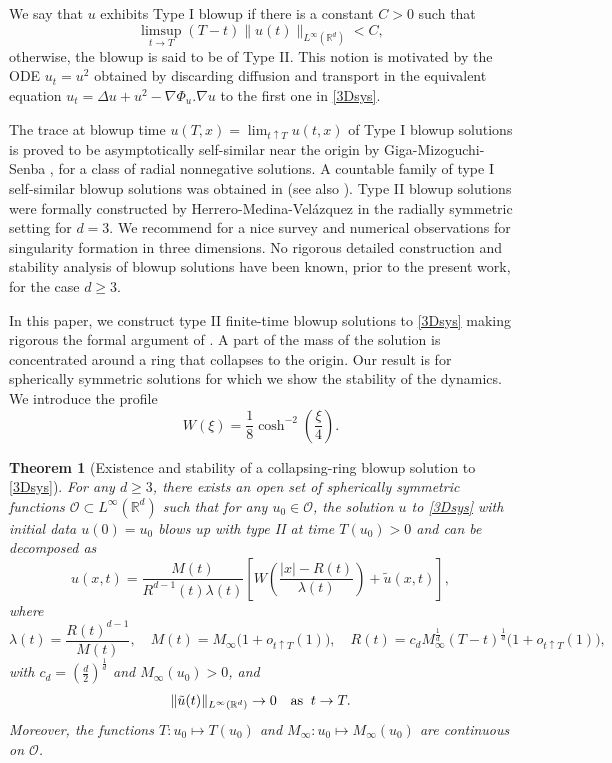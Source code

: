 \documentclass[11pt]{aims}
\newtheorem{theorem}{Theorem}[section]
\theoremstyle{definition}
\newcommand{\Rb}{\mathbb{R}}
\newcommand{\Oc}{\mathcal{O}}
\numberwithin{equation}{section}
\begin{document}
We say that $u$ exhibits Type I blowup if there is a constant $C > 0$ such that 
$$\limsup_{t \to T} (T-t)\| u(t)\|_{L^\infty(\Rb^d)} < C,$$
otherwise, the blowup is said to be of Type II. This notion is motivated by the ODE $u_t = u^2$ obtained by discarding
diffusion and transport in the equivalent equation $u_t = \Delta u + u^2 - \nabla \Phi_u. \nabla u$ to the first one in \eqref{3Dsys}.

The trace at blowup time $u(T,x)=\lim_{t\uparrow T}u(t,x)$ of Type I blowup solutions is proved to be asymptotically self-similar near the origin by Giga-Mizoguchi-Senba \cite{GMSarma11}, for a class of radial nonnegative solutions. A countable family of type I self-similar blowup solutions was obtained in \cite{HMVjcam98} (see also \cite{Se}). Type II blowup solutions were formally constructed by Herrero-Medina-Vel\'azquez \cite{HMVnonl97} in the radially symmetric setting for $d = 3$. We recommend \cite{BCKSVnon99} for a nice survey and numerical observations for singularity formation in three dimensions. No rigorous detailed construction and stability analysis of blowup solutions have been known, prior to the present work, for the case $d \geq 3$.

In this paper, we construct type II finite-time blowup solutions to \eqref{3Dsys} making rigorous the formal argument of \cite{HMVnonl97}. A part of the mass of the solution is concentrated around a ring that collapses to the origin. Our result is for spherically symmetric solutions for which we show the stability of the dynamics. We introduce the profile
$$
W(\xi)=\frac 18 \cosh^{-2}\left(\frac \xi 4 \right).
$$


\begin{theorem}[Existence and stability of a collapsing-ring blowup solution to \eqref{3Dsys}]  \label{theo:1}  For any $d \geq 3$, there exists an open set of spherically symmetric functions $\Oc \subset L^{\infty}(\mathbb R^d)$ such that for any $ u_0 \in \Oc$, the solution $u$ to \eqref{3Dsys} with initial data $u(0)=u_0$ blows up with type II at time $T(u_0)>0$ and can be decomposed as 
\begin{equation}\label{eq:decomp_murt}
u(x,t) = \frac{M(t)}{R^{d-1}(t)\lambda(t)} \left[W\left(\frac{|x|-R(t)}{\lambda(t)}  \right)+\tilde u\left(x,t\right)\right],
\end{equation}
 where
\begin{equation}\label{eq:bdparametersmainth}
\lambda(t) = \frac{R(t)^{d-1}}{M(t)}, \quad M(t) =  M_\infty \big(1 + o_{t \uparrow T}(1)\big), \quad R(t) = c_d M_\infty^{\frac 1d} (T-t)^\frac{1}{d} \big(1 + o_{t \uparrow T}(1)\big),
\end{equation}
with $c_d=(\frac d2)^{\frac 1d}$ and $M_\infty (u_0)>0$, and 
\begin{equation}\label{eq:bdvarepsilonmainth}
 \| \tilde u(t)\|_{L^\infty(\mathbb R^d)} \to 0 \quad \textup{as}\;\; t \to T.
\end{equation}
Moreover, the functions $T:u_0\mapsto T(u_0)$ and $M_\infty :u_0\mapsto M_\infty(u_0)$ are continuous on $\mathcal O$.

\end{theorem}  
\end{document}
